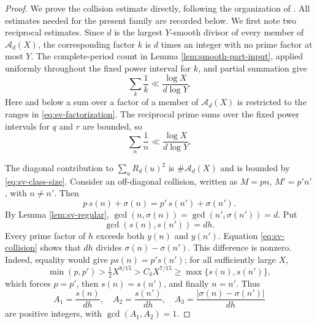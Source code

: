 \documentclass[11pt,letterpaper,reqno]{amsart}
\numberwithin{equation}{section}
\theoremstyle{remark}
\newcommand{\1}{\mathbf 1}
\renewcommand{\geq}{\geqslant}
\begin{document}
\begin{proof}
We prove the collision estimate directly, following the organization of
\cite[(3.4), \S\S3.1--3.2]{LucaPomerance}. All estimates needed for the
present family are recorded below. We first note two reciprocal estimates. Since $d$ is the largest $Y$-smooth divisor of every
member of $\mathcal{A}_d(X)$, the corresponding factor $k$ is $d$ times an
integer with no prime factor at most $Y$. The complete-period count in
Lemma \ref{lem:smooth-part-input}, applied uniformly throughout the fixed
power interval for $k$, and partial summation give
\begin{equation}\label{eq:sv-k-reciprocal}
 \sum_{k}\frac1k\ll\frac{\log X}{d\log Y}.
\end{equation}
Here and below a sum over a factor of a member of $\mathcal{A}_d(X)$ is
restricted to the ranges in \eqref{eq:sv-factorization}. The reciprocal
prime sums over the fixed power intervals for $q$ and $r$ are bounded, so
\begin{equation}\label{eq:sv-m-reciprocal}
 \sum_n\frac1n\ll\frac{\log X}{d\log Y}.
\end{equation}

The diagonal contribution to $\sum_uR_d(u)^2$ is
$\#\mathcal{A}_d(X)$ and is bounded by \eqref{eq:sv-class-size}. Consider
an off-diagonal collision, written as $M=pn$, $M'=p'n'$, with $n\ne n'$.
Then
\begin{equation}\label{eq:sv-collision}
 p\,s(n)+\sigma(n)=p'\,s(n')+\sigma(n').
\end{equation}
By Lemma \ref{lem:sv-regular},
$\gcd(n,\sigma(n))=\gcd(n',\sigma(n'))=d$. Put
\[
 \gcd(s(n),s(n'))=dh.
\]
Every prime factor of $h$ exceeds both $y(n)$ and $y(n')$. Equation
\eqref{eq:sv-collision} shows that $dh$ divides
$\sigma(n)-\sigma(n')$. This difference is nonzero. Indeed, equality
would give $p s(n)=p's(n')$; for all sufficiently large $X$,
\[
 \min(p,p')>\tfrac12X^{8/15}>C_\delta X^{7/15}
 \geq\max\{s(n),s(n')\},
\]
which forces $p=p'$, then $s(n)=s(n')$, and finally $n=n'$. Thus
\[
 A_1=\frac{s(n)}{dh},\quad
 A_2=\frac{s(n')}{dh},\quad
 A_3=\frac{|\sigma(n)-\sigma(n')|}{dh}
\]
are positive integers, with $\gcd(A_1,A_2)=1$.


\end{proof}
\end{document}
